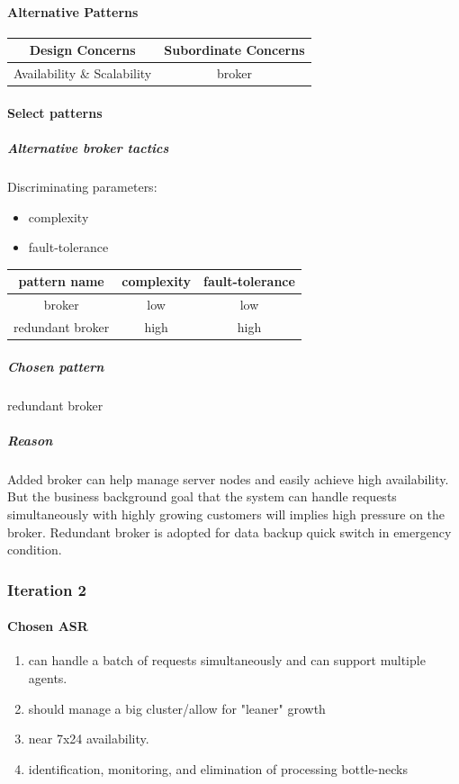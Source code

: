 \documentclass{article}
\begin{document}
			\paragraph{Alternative Patterns}
			\begin{center}
				\begin{tabular}{|c|c|}
					\hline
					Design Concerns & Subordinate Concerns\\
					\hline 
					Availability \& Scalability & broker\\
					\hline
				\end{tabular}
			\end{center}
			\paragraph{Select patterns}
			\subparagraph{Alternative broker tactics}
			Discriminating parameters:\\
			\begin{itemize}
				\item complexity
				\item fault-tolerance
			\end{itemize}
			\begin{center}
				\begin{tabular}{|c|c|c|}
					\hline
					pattern name & complexity & fault-tolerance\\
					\hline
					broker& low& low\\
					\hline
					redundant broker& high& high\\
					\hline
				\end{tabular}
			\end{center}
			\subparagraph{Chosen pattern} 
			redundant broker
			\subparagraph{Reason} 
			Added broker can help manage server nodes and easily achieve high availability. But the business background goal that the system can handle requests simultaneously with highly growing customers will implies high pressure on the broker. Redundant broker is adopted for data backup quick switch in emergency condition. 

		\subsubsection{Iteration 2}
			\paragraph{Chosen ASR}
			\begin{enumerate}
			\item can handle a batch of requests simultaneously and can support multiple agents.
			\item should manage a big cluster/allow for "leaner" growth
			\item near 7x24 availability.
			\item identification, monitoring, and elimination of processing bottle-necks
			\end{enumerate}
\end{document}
